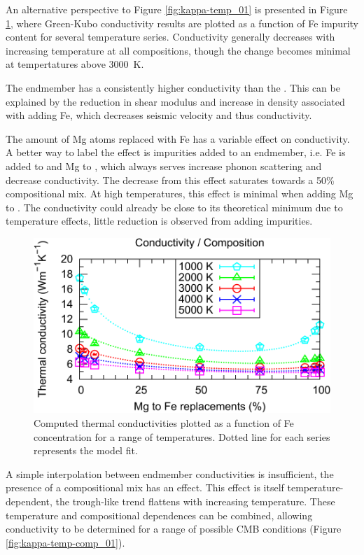 An alternative perspective to Figure \ref{fig:kappa-temp_01} is presented in Figure \ref{fig:kappa-comp_01}, where Green-Kubo conductivity results are plotted as a function of Fe impurity content for several temperature series. Conductivity generally decreases with increasing temperature at all compositions, though the change becomes minimal at tempertatures above 3000~K.

The \mgsios endmember has a consistently higher conductivity than the \fesio. This can be explained by the reduction in shear modulus and increase in density associated with adding Fe, which decreases seismic velocity and thus conductivity.

The amount of Mg atoms replaced with Fe has a variable effect on conductivity. A better way to label the effect is impurities added to an endmember, i.e. Fe is added to \mgsios and Mg to \fesio, which always serves increase phonon scattering and decrease conductivity. The decrease from this effect saturates towards a 50\% compositional mix. At high temperatures, this effect is minimal when adding Mg to \fesio. The conductivity could already be close to its theoretical minimum due to temperature effects, little reduction is observed from adding impurities.

\begin{figure}[h!]
  \includegraphics[width=\linewidth]{Figures/k-c_all_01.png}
  \caption[CONTENTS BIT]{Computed thermal conductivities plotted as a function of Fe concentration for a range of temperatures. Dotted line for each series represents the model fit.}
  \label{fig:kappa-comp_01}
\end{figure}

A simple interpolation between endmember conductivities is insufficient, the presence of a compositional mix has an effect. This effect is itself temperature-dependent, the trough-like trend flattens with increasing temperature. These temperature and compositional dependences can be combined, allowing conductivity to be determined for a range of possible CMB conditions (Figure \ref{fig:kappa-temp-comp_01}). 

